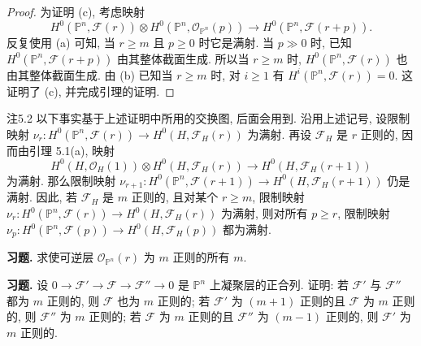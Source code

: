 \begin{proof}
为证明 (c), 考虑映射
\[
 H^0(\mathbb P^n,\mathcal F(r))\otimes H^0(\mathbb P^n,\mathcal O_{\mathbb P^n}(p))
 \longrightarrow H^0(\mathbb P^n,\mathcal F(r+p)).
\]
反复使用 (a) 可知, 当 $r\geq m$ 且 $p\geq0$ 时它是满射. 当 $p\gg0$ 时, 已知 $H^0(\mathbb P^n,\mathcal F(r+p))$ 由其整体截面生成. 所以当 $r\geq m$ 时, $H^0(\mathbb P^n,\mathcal F(r))$ 也由其整体截面生成.
由 (b) 已知当 $r\geq m$ 时, 对 $i\geq1$ 有 $H^i(\mathbb P^n,\mathcal F(r))=0$. 这证明了 (c), 并完成引理的证明.
\end{proof}

\begin{origstatement}{注}{5.2}\label{ch05:rem5.2}
以下事实基于上述证明中所用的交换图, 后面会用到. 沿用上述记号, 设限制映射 $\nu_r:H^0(\mathbb P^n,\mathcal F(r))\to H^0(H,\mathcal F_H(r))$ 为满射. 再设 $\mathcal F_H$ 是 $r$ 正则的, 因而由引理 5.1(a), 映射
\[
 H^0(H,\mathcal O_H(1))\otimes H^0(H,\mathcal F_H(r))
 \longrightarrow H^0(H,\mathcal F_H(r+1))
\]
为满射. 那么限制映射 $\nu_{r+1}:H^0(\mathbb P^n,\mathcal F(r+1))\to H^0(H,\mathcal F_H(r+1))$ 仍是满射. 因此, 若 $\mathcal F_H$ 是 $m$ 正则的, 且对某个 $r\geq m$, 限制映射 $\nu_r:H^0(\mathbb P^n,\mathcal F(r))\to H^0(H,\mathcal F_H(r))$ 为满射, 则对所有 $p\geq r$, 限制映射 $\nu_p:H^0(\mathbb P^n,\mathcal F(p))\to H^0(H,\mathcal F_H(p))$ 都为满射.
\end{origstatement}

\textbf{习题.} 求使可逆层 $\mathcal O_{\mathbb P^n}(r)$ 为 $m$ 正则的所有 $m$.

\textbf{习题.} 设 $0\to\mathcal F'\to\mathcal F\to\mathcal F''\to0$ 是 $\mathbb P^n$ 上凝聚层的正合列. 证明: 若 $\mathcal F'$ 与 $\mathcal F''$ 都为 $m$ 正则的, 则 $\mathcal F$ 也为 $m$ 正则的; 若 $\mathcal F'$ 为 $(m+1)$ 正则的且 $\mathcal F$ 为 $m$ 正则的, 则 $\mathcal F''$ 为 $m$ 正则的; 若 $\mathcal F$ 为 $m$ 正则的且 $\mathcal F''$ 为 $(m-1)$ 正则的, 则 $\mathcal F'$ 为 $m$ 正则的.

